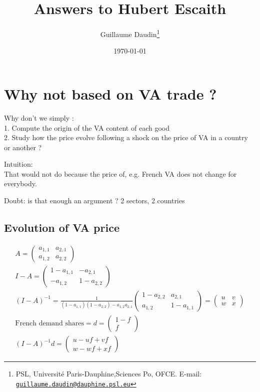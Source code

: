 \documentclass[11pt,a4paper]{article}
\newcommand{\email}[1]{\href{mailto:#1}{\nolinkurl{#1}}}
\begin{document}
\title{Answers to Hubert Escaith\\
\vspace{1cm}
}
\vspace{1cm}
\date{\today}
\author{Guillaume Daudin\thanks{PSL, Universit\'e Paris-Dauphine,Sciences Po, OFCE. E-mail: \email{guillaume.daudin@dauphine.psl.eu}}}
\maketitle

\section{Why not based on VA trade ?}
Why don't we simply : \\
1. Compute the origin of the VA content of each good \\
2. Study how the price evolve following a shock on the price of VA in a country or another ?

Intuition: \\
That would not do because the price of, e.g. French VA does not change for everybody.

Doubt: is that enough an argument ?
2 sectors, 2 countries
\subsection{Evolution of VA price}
\begin{gather*}
A=\left(\begin{matrix}a_{1,1}&a_{2,1}\\a_{1,2}&a_{2,2}\end{matrix}\right)
\\
I-A=\left(\begin{matrix}1-a_{1,1}&-a_{2,1}\\-a_{1,2}&1-a_{2,2}\end{matrix}\right)
\\
\left(I-A\right)^{-1}=\frac{1}{\left(1-a_{1,1}\right)\left(1-a_{2,2}\right)-a_{1,2}a_{2,1}}\left(\begin{matrix}1-a_{2,2}&a_{2,1}\\a_{1,2}&1-a_{1,1}\end{matrix}\right) =\left(\begin{matrix}u&v\\w&x\end{matrix}\right)
\\
\text{French demand shares}=d=\left(\begin{matrix}1-f\\f\end{matrix}\right) \\
\left(I-A\right)^{-1}d=\left(\begin{matrix}u-uf+vf\\w-wf+xf\end{matrix}\right)
\end{gather*}
\end{document}

